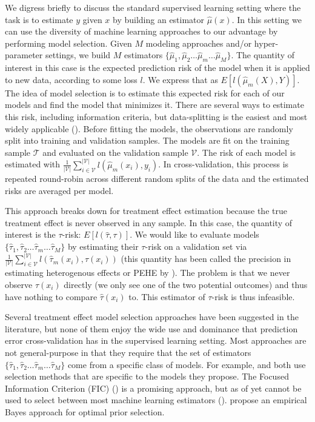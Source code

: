 We digress briefly to discuss the standard supervised learning setting where the task is to estimate $y$ given $x$ by building an estimator $\hat{\mu}(x)$. In this setting we can use the diversity of machine learning approaches to our advantage by performing model selection. Given $M$ modeling approaches and/or hyper-parameter settings, we build $M$ estimators $\{\hat \mu_1, \hat \mu_2 \dots \hat \mu_m \dots \hat \mu_M\}$. The quantity of interest in this case is the expected prediction risk of the model when it is applied to new data, according to some loss $l$. We express that as $E[l(\hat \mu_m(X), Y)]$. The idea of model selection is to estimate this expected risk for each of our models and find the model that minimizes it. There are several ways to estimate this risk, including information criteria, but data-splitting is the easiest and most widely applicable (\citealp{esl:2009wc, Arlot:2010fl, Dudoit:2005jw}). Before fitting the models, the observations are randomly split into training and validation samples. The models are fit on the training sample $\mathcal{T}$ and evaluated on the validation sample $\mathcal{V}$. The risk of each model is estimated with $\frac{1}{|\mathcal{V}|}\sum_{i \in \mathcal{V}}^{|\mathcal{V}|} l(\hat \mu_m (x_i), y_i)$. In cross-validation, this process is repeated round-robin across different random splits of the data and the estimated risks are averaged per model.

This approach breaks down for treatment effect estimation because the true treatment effect is never observed in any sample. In this case, the quantity of interest is the $\tau$-risk: $E[l(\hat\tau, \tau)]$. We would like to evaluate models $\{\hat\tau_1, \hat\tau_2 \dots \hat \tau_m \dots \hat \tau_M\}$ by estimating their $\tau$-risk on a validation set via $\frac{1}{|\mathcal{V}|}\sum_{i \in \mathcal{V}}^{|\mathcal{V}|}  l(\hat \tau_m (x_i), \tau(x_i))$ (this quantity has been called the precision in estimating heterogenous effects or PEHE by \citet{Hill2011}). The problem is that we never observe $\tau(x_i)$ directly (we only see one of the two potential outcomes) and thus have nothing to compare $\hat\tau(x_i)$ to. This estimator of $\tau$-risk is thus infeasible.

Several treatment effect model selection approaches have been suggested in the literature, but none of them enjoy the wide use and dominance that prediction error cross-validation has in the supervised learning setting. Most approaches are not general-purpose in that they require that the set of estimators $\{\hat\tau_1, \hat\tau_2 \dots \hat \tau_m \dots \hat \tau_M\}$ come from a specific class of models. For example, \citet{Powers:2017wd} and \citet{Athey2015} both use selection methods that are specific to the models they propose. The Focused Information Criterion (FIC) (\citealp{Claeskens:2003ck}) is a promising approach, but as of yet cannot be used to select between most machine learning estimators (\citealp{Jullum:2012uo}). \citet{Alaa:tj} propose an empirical Bayes approach for optimal prior selection.


